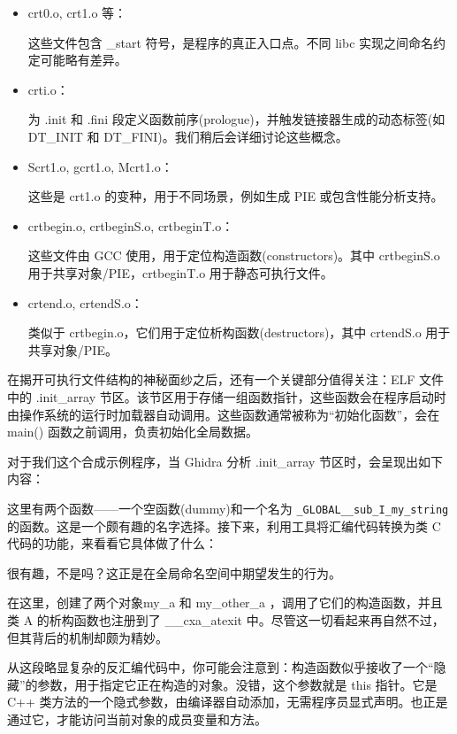 \begin{itemize}
\item 
crt0.o, crt1.o 等：

这些文件包含 \_start 符号，是程序的真正入口点。不同 libc 实现之间命名约定可能略有差异。

\item 
crti.o：

为 .init 和 .fini 段定义函数前序(prologue)，并触发链接器生成的动态标签(如 DT\_INIT 和 DT\_FINI)。我们稍后会详细讨论这些概念。

\item 
Scrt1.o, gcrt1.o, Mcrt1.o：

这些是 crt1.o 的变种，用于不同场景，例如生成 PIE 或包含性能分析支持。

\item 
crtbegin.o, crtbeginS.o, crtbeginT.o：

这些文件由 GCC 使用，用于定位构造函数(constructors)。其中 crtbeginS.o 用于共享对象/PIE，crtbeginT.o 用于静态可执行文件。

\item 
crtend.o, crtendS.o：

类似于 crtbegin.o，它们用于定位析构函数(destructors)，其中 crtendS.o 用于共享对象/PIE。
\end{itemize}

在揭开可执行文件结构的神秘面纱之后，还有一个关键部分值得关注：ELF 文件中的 .init\_array 节区。该节区用于存储一组函数指针，这些函数会在程序启动时由操作系统的运行时加载器自动调用。这些函数通常被称为“初始化函数”，会在 main() 函数之前调用，负责初始化全局数据。

对于我们这个合成示例程序，当 Ghidra 分析 .init\_array 节区时，会呈现出如下内容：


这里有两个函数——一个空函数(dummy)和一个名为 \verb|_GLOBAL__sub_I_my_string| 的函数。这是一个颇有趣的名字选择。接下来，利用工具将汇编代码转换为类 C 代码的功能，来看看它具体做了什么：


很有趣，不是吗？这正是在全局命名空间中期望发生的行为。

在这里，创建了两个对象my\_a 和 my\_other\_a ，调用了它们的构造函数，并且类 A 的析构函数也注册到了 \_\_cxa\_atexit 中。尽管这一切看起来再自然不过，但其背后的机制却颇为精妙。

从这段略显复杂的反汇编代码中，你可能会注意到：构造函数似乎接收了一个“隐藏”的参数，用于指定它正在构造的对象。没错，这个参数就是 this 指针。它是 C++ 类方法的一个隐式参数，由编译器自动添加，无需程序员显式声明。也正是通过它，才能访问当前对象的成员变量和方法。

